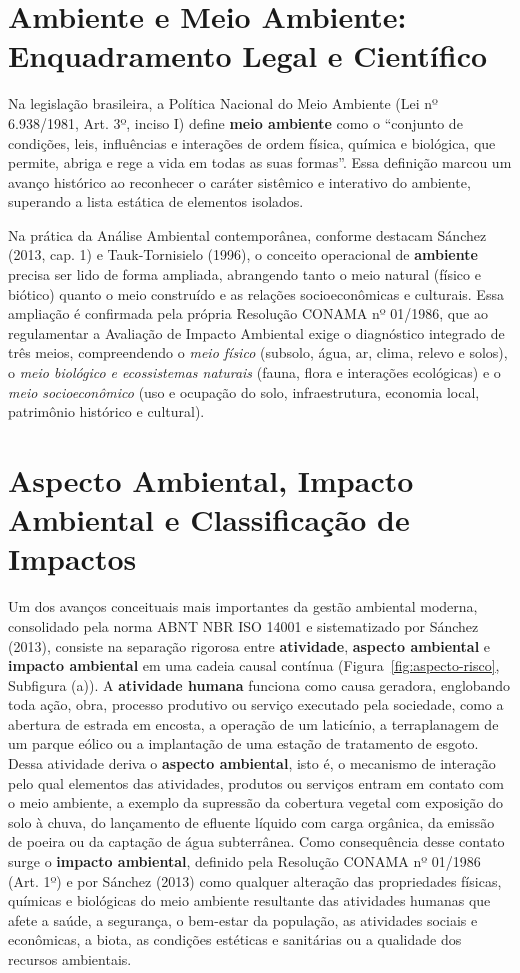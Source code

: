 \section{Ambiente e Meio Ambiente: Enquadramento Legal e Científico}

Na legislação brasileira, a Política Nacional do Meio Ambiente (Lei nº 6.938/1981, Art. 3º, inciso I) define \textbf{meio ambiente} como o ``conjunto de condições, leis, influências e interações de ordem física, química e biológica, que permite, abriga e rege a vida em todas as suas formas''. Essa definição marcou um avanço histórico ao reconhecer o caráter sistêmico e interativo do ambiente, superando a lista estática de elementos isolados.

Na prática da Análise Ambiental contemporânea, conforme destacam Sánchez (2013, cap. 1) e Tauk-Tornisielo (1996), o conceito operacional de \textbf{ambiente} precisa ser lido de forma ampliada, abrangendo tanto o meio natural (físico e biótico) quanto o meio construído e as relações socioeconômicas e culturais. Essa ampliação é confirmada pela própria Resolução CONAMA nº 01/1986, que ao regulamentar a Avaliação de Impacto Ambiental exige o diagnóstico integrado de três meios, compreendendo o \textit{meio físico} (subsolo, água, ar, clima, relevo e solos), o \textit{meio biológico e ecossistemas naturais} (fauna, flora e interações ecológicas) e o \textit{meio socioeconômico} (uso e ocupação do solo, infraestrutura, economia local, patrimônio histórico e cultural).

\section{Aspecto Ambiental, Impacto Ambiental e Classificação de Impactos}

Um dos avanços conceituais mais importantes da gestão ambiental moderna, consolidado pela norma ABNT NBR ISO 14001 e sistematizado por Sánchez (2013), consiste na separação rigorosa entre \textbf{atividade}, \textbf{aspecto ambiental} e \textbf{impacto ambiental} em uma cadeia causal contínua (Figura~\ref{fig:aspecto-risco}, Subfigura (a)). A \textbf{atividade humana} funciona como causa geradora, englobando toda ação, obra, processo produtivo ou serviço executado pela sociedade, como a abertura de estrada em encosta, a operação de um laticínio, a terraplanagem de um parque eólico ou a implantação de uma estação de tratamento de esgoto. Dessa atividade deriva o \textbf{aspecto ambiental}, isto é, o mecanismo de interação pelo qual elementos das atividades, produtos ou serviços entram em contato com o meio ambiente, a exemplo da supressão da cobertura vegetal com exposição do solo à chuva, do lançamento de efluente líquido com carga orgânica, da emissão de poeira ou da captação de água subterrânea. Como consequência desse contato surge o \textbf{impacto ambiental}, definido pela Resolução CONAMA nº 01/1986 (Art. 1º) e por Sánchez (2013) como qualquer alteração das propriedades físicas, químicas e biológicas do meio ambiente resultante das atividades humanas que afete a saúde, a segurança, o bem-estar da população, as atividades sociais e econômicas, a biota, as condições estéticas e sanitárias ou a qualidade dos recursos ambientais.

